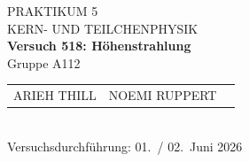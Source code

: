 \documentclass[%
paper=a4,       %
fontsize=11pt,  %
ngerman         %
]{scrreprt}
\begin{document}
\begin{titlepage}
  \centering
  \vspace*{2cm}
  
  {\Large PRAKTIKUM 5}\\[0.5cm]
  {\large KERN- UND TEILCHENPHYSIK }\\[1cm]
  
  {\LARGE\bfseries Versuch 518: Höhenstrahlung}\\[1cm]
  
  Gruppe A112\\[1cm]
  
  \begin{tabular}{lll}
    ARIEH THILL & NOEMI RUPPERT  \\
  \end{tabular}\\[2cm]
  
  Versuchsdurchführung: 01.~/ 02.~Juni 2026
  
  \vfill
\end{titlepage}

\tableofcontents
\clearpage
\clearpage
\setcounter{page}{1}
 
 



\appendix
\printbibliography{}
%
\end{document}
